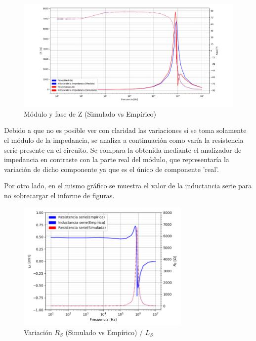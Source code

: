 \begin{figure}[H]
\centering
\includegraphics[width=1\textwidth]{Ejercicio_1(Germo)/Grafico/Inductancia_relacion_entre_Z_y_fases.png}
\caption{Módulo y fase de Z (Simulado vs Empírico)}
\label{fig:Inductancia_relacion_entre_Z_y_fases}
\end{figure}

Debido a que no es posible ver con claridad las variaciones si se toma solamente el módulo de la impedancia, se analiza a continuación como varía la resistencia serie presente en el circuito. Se compara la obtenida mediante el analizador de impedancia en contraste con la parte real del módulo, que representaría la variación de dicho componente ya que es el único de componente 'real'.\par
Por otro lado, en el mismo gráfico se muestra el valor de la inductancia serie para no sobrecargar el informe de figuras.

\begin{figure}[H]
\centering
\includegraphics[width=0.75\textwidth]{Ejercicio_1(Germo)/Grafico/Inductancia_relacion_entre_L_s_y_R_s.png}
\caption{Variación $R_S$ (Simulado vs Empírico) / $L_S$ }
\label{fig:Inductancia_relacion_entre_L_s_y_R_s}
\end{figure}

